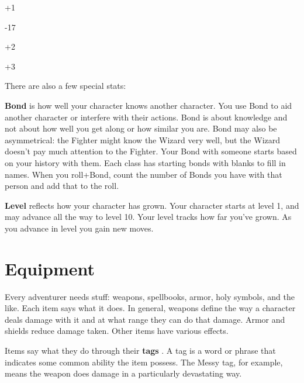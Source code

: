 \bTD
+1
\eTD

\eTR
 		
\bTR

-17
\eTD

\bTD
+2
\eTD

\eTR
 		
\bTR

\eTD

\bTD
+3
\eTD

\eTR
 	  
\eTABLE
        

There are also a few special stats:

       

         {\bf Bond}  is how well your character knows another character. You use Bond to aid another character or interfere with their actions. Bond is about knowledge and not about how well you get along or how similar you are. Bond may also be asymmetrical: the Fighter might know the Wizard very well, but the Wizard doesn't pay much attention to the Fighter. Your Bond with someone starts based on your history with them. Each class has starting bonds with blanks to fill in names. When you roll+Bond, count the number of Bonds you have with that person and add that to the roll.

       

         {\bf Level}  reflects how your character has grown. Your character starts at level 1, and may advance all the way to level 10. Your level tracks how far you've grown. As you advance in level you gain new moves.

       
\section{Equipment}   
       

Every adventurer needs stuff: weapons, spellbooks, armor, holy symbols, and the like. Each item says what it does. In general, weapons define the way a character deals damage with it and at what range they can do that damage. Armor and shields reduce damage taken. Other items have various effects.

       

Items say what they do through their {\bf tags} . A tag is a word or phrase that indicates some common ability the item possess. The Messy tag, for example, means the weapon does damage in a particularly devastating way.

       

